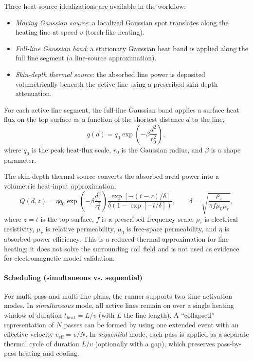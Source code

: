   Three heat-source idealizations are available in the workflow:
  \begin{itemize}
    \item \emph{Moving Gaussian source}: a localized Gaussian spot translates along the heating line at speed $v$ (torch-like heating).
    \item \emph{Full-line Gaussian band}: a stationary Gaussian heat band is applied along the full line segment (a line-source approximation).
    \item \emph{Skin-depth thermal source}: the absorbed line power is deposited volumetrically beneath the active line using a prescribed skin-depth attenuation.
  \end{itemize}

  \noindent For each active line segment, the full-line Gaussian band applies a surface heat flux on the top surface as a function of the shortest distance $d$ to the line,
  \begin{equation}
  q(d) = q_0 \exp\left(-\beta \frac{d^2}{r_0^2}\right),
  \end{equation}
  where $q_0$ is the peak heat-flux scale, $r_0$ is the Gaussian radius, and $\beta$ is a shape parameter.

  The skin-depth thermal source converts the absorbed areal power into a volumetric heat-input approximation,
  \begin{equation}
  Q(d,z) =
  \eta q_0 \exp\left(-\beta \frac{d^2}{r_0^2}\right)
  \frac{\exp[-(t-z)/\delta]}{\delta\left(1-\exp[-t/\delta]\right)},
  \qquad
  \delta=\sqrt{\frac{\rho_e}{\pi f \mu_0 \mu_r}},
  \end{equation}
  where $z=t$ is the top surface, $f$ is a prescribed frequency scale, $\rho_e$ is electrical resistivity, $\mu_r$ is relative permeability, $\mu_0$ is free-space permeability, and $\eta$ is absorbed-power efficiency. This is a reduced thermal approximation for line heating; it does not solve the surrounding coil field and is not used as evidence for electromagnetic model validation.

  \paragraph{Scheduling (simultaneous vs. sequential)}
  For multi-pass and multi-line plans, the runner supports two time-activation modes. In \emph{simultaneous} mode, all active lines remain on over a single heating window of duration $t_{\mathrm{heat}}=L/v$ (with $L$ the line length). A ``collapsed'' representation of $N$ passes can be formed by using one extended event with an effective velocity $v_{\mathrm{eff}}=v/N$. In \emph{sequential} mode, each pass is applied as a separate thermal cycle of duration $L/v$ (optionally with a gap), which preserves pass-by-pass heating and cooling.

